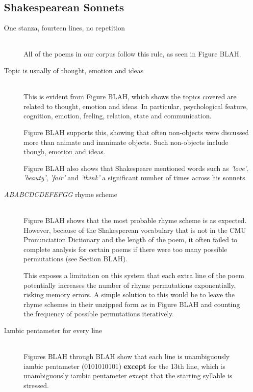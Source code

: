 \subsection{Shakespearean Sonnets}

\begin{description}
\item[One stanza, fourteen lines, no repetition]  \hfill \\
All of the poems in our corpus follow this rule, as seen in Figure BLAH.

\item[Topic is usually of thought, emotion and ideas]  \hfill \\
This is evident from Figure BLAH, which shows the topics covered are related to thought, emotion and ideas. In particular, psychological feature, cognition, emotion, feeling, relation, state and communication.

Figure BLAH supports this, showing that often non-objects were discussed more than animate and inanimate objects. Such non-objects include though, emotion and ideas.

Figure BLAH also shows that Shakespeare mentioned words such as \textit{'love'}, \textit{'beauty'}, \textit{'fair'} and \textit{'think'} a significant number of times across his sonnets.

\item[\textit{ABABCDCDEFEFGG} rhyme scheme]  \hfill \\
Figure BLAH shows that the most probable rhyme scheme is as expected. However, because of the Shakesperean vocabulary that is not in the CMU Pronunciation Dictionary and the length of the poem, it often failed to complete analysis for certain poems if there were too many possible permutations (see Section BLAH). 

This exposes a limitation on this system that each extra line of the poem potentially increases the number of rhyme permutations exponentially, risking memory errors. A simple solution to this would be to leave the rhyme schemes in their unzipped form as in Figure BLAH and counting the frequency of possible permutations iteratively.

\item[Iambic pentameter for every line]  \hfill \\
Figures BLAH through BLAH show that each line is unambiguously iambic pentameter (0101010101) \textbf{except} for the 13th line, which is unambiguously iambic pentameter except that the starting syllable is stressed.


\end{description}
